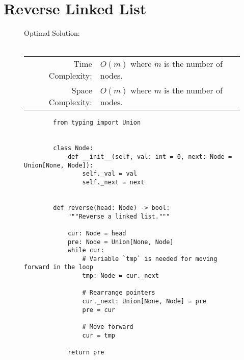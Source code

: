 
\section{Reverse Linked List}

\begin{figure}[H]
    Optimal Solution:\\\\
    \begin{tabular}{rl}
        Time Complexity:& \(O(m)\) where \(m\) is the number of nodes.\\
        Space Complexity:& \(O(m)\) where \(m\) is the number of nodes.
    \end{tabular}
\end{figure}

\begin{figure}[H]
    \centering
    \begin{verbatim}
        from typing import Union


        class Node:
            def __init__(self, val: int = 0, next: Node = Union[None, Node]):
                self._val = val
                self._next = next


        def reverse(head: Node) -> bool:
            """Reverse a linked list."""

            cur: Node = head
            pre: Node = Union[None, Node]
            while cur:
                # Variable `tmp` is needed for moving forward in the loop
                tmp: Node = cur._next

                # Rearrange pointers
                cur._next: Union[None, Node] = pre
                pre = cur

                # Move forward
                cur = tmp

            return pre
    \end{verbatim}
\end{figure}
